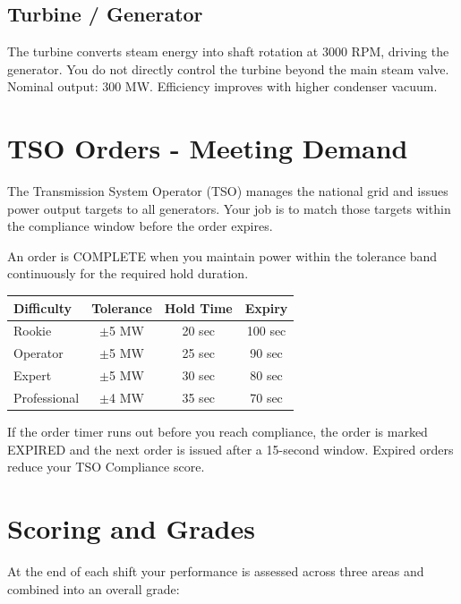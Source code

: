\documentclass[10pt,a5paper]{article}
\begin{document}
\subsection{Turbine / Generator}

The turbine converts steam energy into shaft rotation at 3000 RPM, driving
the generator. You do not directly control the turbine beyond the main steam
valve. Nominal output: 300 MW. Efficiency improves with higher condenser vacuum.

\section{TSO Orders - Meeting Demand}

The Transmission System Operator (TSO) manages the national grid and issues
power output targets to all generators. Your job is to match those targets
within the compliance window before the order expires.

An order is COMPLETE when you maintain power within the tolerance band
continuously for the required hold duration.

\begin{center}
\begin{tabular}{lccc}
\toprule
\textbf{Difficulty} & \textbf{Tolerance} & \textbf{Hold Time} & \textbf{Expiry} \\
\midrule
Rookie       & $\pm$5 MW & 20 sec & 100 sec \\
Operator     & $\pm$5 MW & 25 sec & 90 sec  \\
Expert       & $\pm$5 MW & 30 sec & 80 sec  \\
Professional & $\pm$4 MW & 35 sec & 70 sec  \\
\bottomrule
\end{tabular}
\end{center}

If the order timer runs out before you reach compliance, the order is marked
EXPIRED and the next order is issued after a 15-second window. Expired orders
reduce your TSO Compliance score.

\section{Scoring and Grades}

At the end of each shift your performance is assessed across three areas and
combined into an overall grade:
\end{document}

